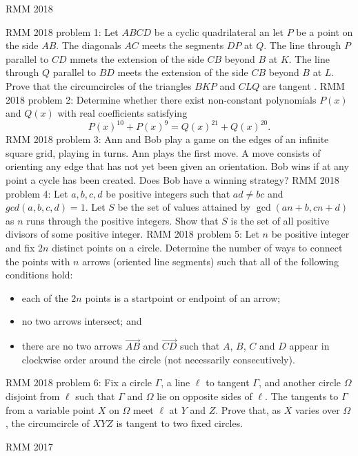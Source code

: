 RMM 2018 

RMM 2018 problem 1:  Let $ABCD$ be a cyclic quadrilateral an let $P$ be a point on the side $AB.$ The diagonals $AC$ meets the segments $DP$ at $Q.$ The line through $P$ parallel to $CD$ mmets the extension of the side $CB$ beyond $B$ at $K.$ The line through $Q$ parallel to $BD$ meets the extension of the side $CB$ beyond $B$ at $L.$ Prove that the circumcircles of the triangles $BKP$ and $CLQ$ are tangent . 
RMM 2018 problem 2:  Determine whether there exist non-constant polynomials $P(x)$ and $Q(x)$ with real coefficients satisfying
\[ P(x)^{10}+P(x)^9 = Q(x)^{21}+Q(x)^{20}. \] 
RMM 2018 problem 3:  Ann and Bob play a game on the edges of an infinite square grid, playing in turns. Ann plays the first move. A move consists of orienting any edge that has not yet been given an orientation. Bob wins if at any point a cycle has been created. Does Bob have a winning strategy? 
RMM 2018 problem 4:  Let $a,b,c,d$ be positive integers such that $ad \neq bc$ and $gcd(a,b,c,d)=1$. Let $S$ be the set of values attained by $\gcd(an+b,cn+d)$ as $n$ runs through the positive integers. Show that $S$ is the set of all positive divisors of some positive integer. 
RMM 2018 problem 5:  Let $n$ be positive integer and fix $2n$ distinct points on a circle. Determine the number of ways to connect the points with $n$ arrows (oriented line segments) such that all of the following conditions hold:
\begin{itemize}
  \item each of the $2n$ points is a startpoint or endpoint 	of an arrow;
  \item no two arrows intersect; and
  \item there are no two arrows $\overrightarrow{AB}$ and 	$\overrightarrow{CD}$ such that $A$, $B$, $C$ and $D$ 	appear in clockwise order around the circle 	(not necessarily consecutively).
\end{itemize} 
RMM 2018 problem 6:  Fix a circle $\Gamma$, a line $\ell$ to tangent $\Gamma$, and another circle $\Omega$ disjoint from $\ell$ such that $\Gamma$ and $\Omega$ lie on opposite sides of $\ell$. The tangents to $\Gamma$ from a variable point $X$ on $\Omega$ meet $\ell$ at $Y$ and $Z$. Prove that, as $X$ varies over $\Omega$, the circumcircle of $XYZ$ is tangent to two fixed circles. 

RMM 2017 

